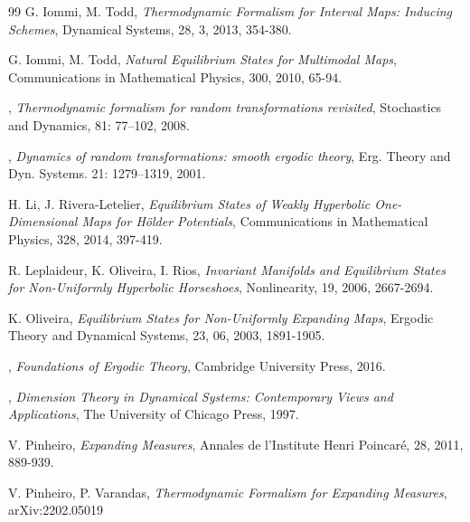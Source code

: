 \documentclass[12pt,a4paper]{amsart}
\theoremstyle{plain}
\begin{document}
\begin{thebibliography}{99}
		 {\sc G. Iommi, M. Todd}, {\it Thermodynamic Formalism for Interval Maps: Inducing Schemes}, Dynamical Systems, 28, 3, 2013, 354-380. 
		
		 {\sc G. Iommi, M. Todd}, {\it Natural Equilibrium States for Multimodal Maps}, Communications in Mathematical Physics, 300, 2010, 65-94. 
		
		
		, {\it Thermodynamic formalism for random transformations revisited},  Stochastics and Dynamics, 81: 77--102,  2008.	
		
		, {\it Dynamics of random transformations: smooth ergodic theory}, Erg. Theory and Dyn. Systems. 21: 1279--1319, 2001.
		
		
		 {\sc H. Li, J. Rivera-Letelier}, {\it Equilibrium States of Weakly Hyperbolic One-Dimensional Maps for H\"older Potentials}, Communications in Mathematical Physics, 328, 2014, 397-419.
		
		 {\sc R. Leplaideur, K. Oliveira, I. Rios}, {\it Invariant Manifolds and Equilibrium States for Non-Uniformly Hyperbolic Horseshoes}, Nonlinearity, 19, 2006, 2667-2694.
		
		 {\sc K. Oliveira}, {\it Equilibrium States for Non-Uniformly Expanding Maps}, Ergodic Theory and Dynamical Systems, 23, 06, 2003, 1891-1905.
		
		, {\it Foundations of Ergodic Theory}, Cambridge University Press, 2016.
		
		
		, {\it Dimension Theory in Dynamical Systems: Contemporary Views and Applications}, The University of Chicago Press, 1997.
		
		
		
		 {\sc V. Pinheiro}, {\it Expanding Measures}, Annales de l'Institute Henri Poincar\' e, 28, 2011, 889-939.
		
		 {\sc V. Pinheiro, P. Varandas}, {\it Thermodynamic Formalism for Expanding Measures}, arXiv:2202.05019
		
		
		

\end{thebibliography}
\end{document}

